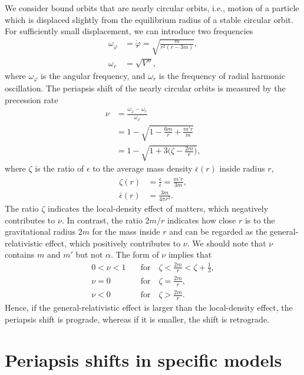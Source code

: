 \documentclass[aps,11pt,nofootinbib,preprintnumbers,groupedaddress,superscriptaddress]{revtex4-2}
\begin{document}
We consider bound orbits
that are nearly circular orbits, i.e., motion of a particle which is displaced slightly from the equilibrium radius of a stable circular orbit.
For sufficiently small displacement, we can introduce two frequencies
\begin{align}
\label{eq:omegavarphi}
\omega_\varphi&= \dot{\varphi}=\sqrt{\frac{m}{r^2(r-3m)}},
\\
\label{eq:omegar}
\omega_r&=\sqrt{V''},
\end{align}
where $\omega_\varphi$ is the angular frequency, and 
$\omega_r$ is the frequency of radial harmonic oscillation.
The periapsis shift
of the nearly circular orbits 
is
measured by the precession rate 
\begin{align}
\nu&=\frac{\omega_\varphi-\omega_r}{\omega_\varphi}
\\
&=1-\sqrt{1-\frac{6m}{r}+\frac{m' r}{m}
}
\\
&=1-\sqrt{1+3\Big(\zeta-\frac{2m}{r}\Big)},
\end{align}
where $\zeta$ is the ratio of $\epsilon$ to 
the average mass density $\bar{\epsilon}(r)$ inside radius $r$,
\begin{align}
\zeta(r)&=\frac{\epsilon}{\bar{\epsilon}}=\frac{m' r}{3m}, 
\\
\bar{\epsilon}(r)&=\frac{3m}{4\pi r^3}.
\end{align}
The ratio $\zeta$ indicates the local-density effect of matters, which negatively contributes to $\nu$. 
In contrast, the ratio $2m/r$ indicates how close $r$ is to the gravitational radius $2m$ for the mass inside $r$ and can be regarded as the 
general-relativistic effect, which positively contributes to $\nu$.
We should note that $\nu$ contains $m$ and $m'$ but not $\alpha$. 
The form of $\nu$ implies that 
\begin{align}
0<\nu<1 \quad &\mathrm{for} \quad 
\zeta <\frac{2m}{r}<\zeta+\frac{1}{3},
\\
\nu=0 \quad &\mathrm{for} \quad 
\zeta=\frac{2m}{r},
\\
\nu<0 \quad &\mathrm{for} \quad 
\zeta>\frac{2m}{r}.
\end{align}
Hence, if the general-relativistic effect is larger than the local-density effect, the periapsis shift is prograde, whereas if it is smaller, the shift is retrograde.



\section{Periapsis shifts in specific models}
\label{sec:4}
\end{document}
